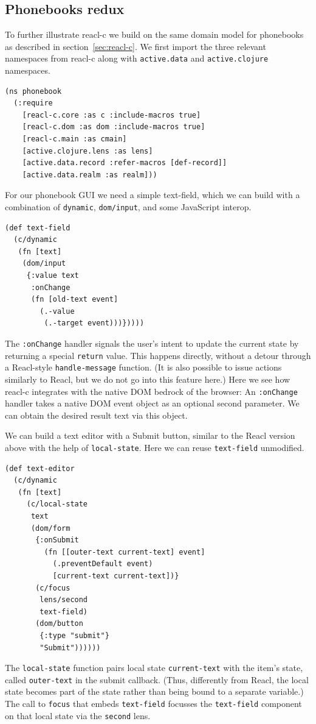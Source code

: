 \documentclass[sigplan,review,screen]{acmart}
\begin{document}
\subsection{Phonebooks redux}

To further illustrate reacl-c we build on the same domain model for
phonebooks as described in section~\ref{sec:reacl-c}.  We first import
the three relevant namespaces from reacl-c along with
\texttt{active.data} and \texttt{active.clojure} namespaces.
%
\begin{verbatim}
(ns phonebook
  (:require
    [reacl-c.core :as c :include-macros true]
    [reacl-c.dom :as dom :include-macros true]
    [reacl-c.main :as cmain]
    [active.clojure.lens :as lens]
    [active.data.record :refer-macros [def-record]]
    [active.data.realm :as realm]))
\end{verbatim}
%
For our phonebook GUI we need a simple text-field, which we can build
with a combination of \texttt{dynamic}, \texttt{dom/input}, and some
JavaScript interop.
%
\begin{verbatim}
(def text-field
  (c/dynamic
   (fn [text]
    (dom/input
     {:value text
      :onChange
      (fn [old-text event]
        (.-value
         (.-target event)))}))))
\end{verbatim}
%
The \texttt{:onChange} handler signals the user's intent to update the
current state by returning a special \texttt{return} value.  This
happens directly, without a detour through a Reacl-style
\texttt{handle-message} function.  (It is also possible to issue
actions similarly to Reacl, but we do not go into this feature here.)
Here we see how reacl-c integrates with the native DOM bedrock of the
browser: An \texttt{:onChange} handler takes a native DOM event object
as an optional second parameter. We can obtain the desired result text
via this object.

We can build a text editor with a Submit button, similar to the Reacl
version above with the help of \texttt{local-state}. Here we can reuse
\texttt{text-field} unmodified.
%
\begin{verbatim}
(def text-editor
  (c/dynamic
   (fn [text]
     (c/local-state
      text
      (dom/form
       {:onSubmit
         (fn [[outer-text current-text] event]
           (.preventDefault event)
           [current-text current-text])}
       (c/focus
        lens/second
        text-field)
       (dom/button
        {:type "submit"}
        "Submit"))))))
\end{verbatim}
%
The \texttt{local-state} function pairs local state \texttt{current-text}
with the item's state, called \texttt{outer-text} in the submit
callback.  (Thus, differently from Reacl, the local state becomes part
of the state rather than being bound to a separate variable.)  The
call to \texttt{focus} that embeds \texttt{text-field} focusses the
\texttt{text-field} component on that local state via the
\texttt{second} lens.
\end{document}
